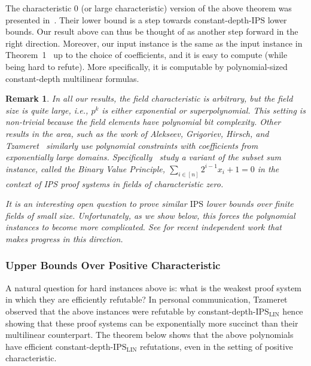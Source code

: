 \documentclass[11pt]{article}
\newtheorem{remark}[theorem]{Remark}
\newcommand{\comment}[2]{\marginpar{\tiny{\textbf{#1: }\textit{#2}}}}
\newcommand{\nl}[1]{\comment{NL}{#1}}
\newcommand{\vr}[1]{\comment{VR}{#1}}
\newcommand{\snote}[1]{\comment{SS}{#1}}
\newcommand{\IPS}{\mathrm{IPS}}
\newcommand{\IPSLIN}{\mathrm{IPS}_{\mathrm{LIN}}}
\begin{document}
The characteristic $0$ (or large characteristic) version of the above theorem was presented in~\cite{GHT}. Their lower bound is a step towards constant-depth-$\IPS$ lower bounds. Our result above can thus be thought of as another step forward in the right direction.
Moreover, our input instance is the same as the input instance in Theorem~1~\cite{GHT} up to the choice of coefficients, and it is easy to compute (while being hard to refute). More specifically, it is computable by polynomial-sized constant-depth multilinear formulas. 

\begin{remark}
    In all our results, the field characteristic is arbitrary, but the field size is quite large, i.e., $p^k$ is either exponential or superpolynomial.  This setting is non-trivial because the field elements have polynomial bit complexity. Other results in the area, such as the work of Alekseev, Grigoriev, Hirsch, and Tzameret~\cite{AGHT} similarly use polynomial constraints with coefficients from exponentially large domains. Specifically~\cite{AGHT} study a variant of the subset sum instance, called the Binary Value Principle, $\sum_{i \in [n]} 2^{i-1} x_i + 1 = 0$ in the context of IPS proof systems in fields of characteristic zero. %
    
    It is an interesting open question to prove similar $\IPS$ lower bounds over finite fields of small size. Unfortunately, as we show below, this forces the polynomial instances to become more complicated. See  for recent independent work that makes progress in this direction.
\end{remark}

\subsubsection{Upper Bounds Over Positive Characteristic}
\label{sec:intro-upper}

A natural question for hard instances above is: what is the weakest proof system in which they are efficiently refutable? In personal communication, Tzameret observed that the above instances were refutable by constant-depth-$\IPSLIN$ hence showing that these proof systems can be exponentially more succinct than their multilinear counterpart. The theorem below shows that the above polynomials have efficient constant-depth-$\IPSLIN$ refutations, even in the setting of positive characteristic. 
\end{document}
